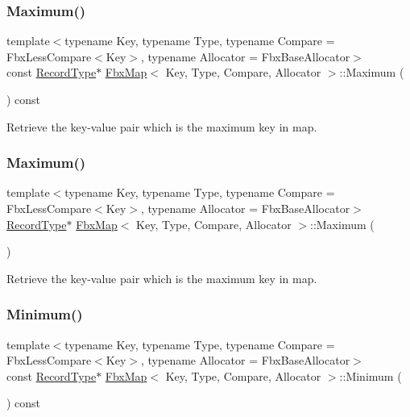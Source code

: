 \subsubsection{\texorpdfstring{Maximum()}{Maximum()}\hspace{0.1cm}{\footnotesize\ttfamily [1/2]}}
{\footnotesize\ttfamily template$<$typename Key, typename Type, typename Compare = Fbx\+Less\+Compare$<$\+Key$>$, typename Allocator = Fbx\+Base\+Allocator$>$ \\
const \hyperlink{class_fbx_map_af8fc887461b3bf29f41aa36d15ddb54f}{Record\+Type}$\ast$ \hyperlink{class_fbx_map}{Fbx\+Map}$<$ Key, Type, Compare, Allocator $>$\+::Maximum (\begin{DoxyParamCaption}{ }\end{DoxyParamCaption}) const}



Retrieve the key-\/value pair which is the maximum key in map. 

\mbox{\label{class_fbx_map_a05a712e0a43083d5397ecda3003d81e1}} 
\subsubsection{\texorpdfstring{Maximum()}{Maximum()}\hspace{0.1cm}{\footnotesize\ttfamily [2/2]}}
{\footnotesize\ttfamily template$<$typename Key, typename Type, typename Compare = Fbx\+Less\+Compare$<$\+Key$>$, typename Allocator = Fbx\+Base\+Allocator$>$ \\
\hyperlink{class_fbx_map_af8fc887461b3bf29f41aa36d15ddb54f}{Record\+Type}$\ast$ \hyperlink{class_fbx_map}{Fbx\+Map}$<$ Key, Type, Compare, Allocator $>$\+::Maximum (\begin{DoxyParamCaption}{ }\end{DoxyParamCaption})}



Retrieve the key-\/value pair which is the maximum key in map. 

\mbox{\label{class_fbx_map_a12efe88fe10227cf0aca2284a3474193}} 
\subsubsection{\texorpdfstring{Minimum()}{Minimum()}\hspace{0.1cm}{\footnotesize\ttfamily [1/2]}}
{\footnotesize\ttfamily template$<$typename Key, typename Type, typename Compare = Fbx\+Less\+Compare$<$\+Key$>$, typename Allocator = Fbx\+Base\+Allocator$>$ \\
const \hyperlink{class_fbx_map_af8fc887461b3bf29f41aa36d15ddb54f}{Record\+Type}$\ast$ \hyperlink{class_fbx_map}{Fbx\+Map}$<$ Key, Type, Compare, Allocator $>$\+::Minimum (\begin{DoxyParamCaption}{ }\end{DoxyParamCaption}) const}



